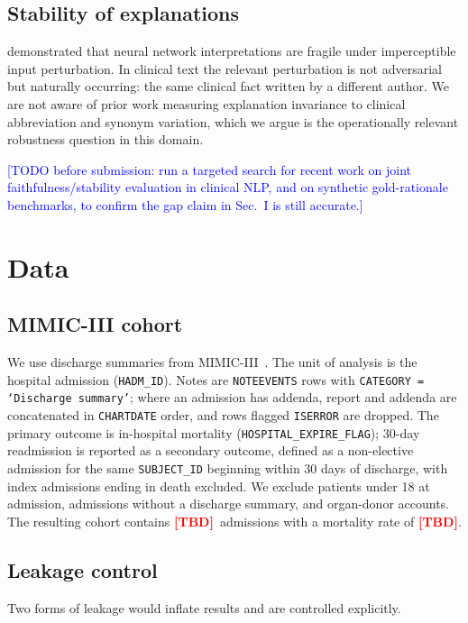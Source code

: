 \documentclass[conference]{IEEEtran}
\newif\ifdraftnums\draftnumstrue   %
\newcommand{\TBD}{\ifdraftnums\textcolor{red}{\textbf{[TBD]}}\else--\fi}
\newcommand{\note}[1]{\ifdraftnums\textcolor{blue}{\small[#1]}\fi}
\begin{document}
\subsection{Stability of explanations}
\cite{ghorbani2019} demonstrated that neural network interpretations are fragile
under imperceptible input perturbation. In clinical text the relevant
perturbation is not adversarial but naturally occurring: the same clinical fact
written by a different author. We are not aware of prior work measuring
explanation invariance to clinical abbreviation and synonym variation, which we
argue is the operationally relevant robustness question in this domain.

\note{TODO before submission: run a targeted search for recent work on joint
faithfulness/stability evaluation in clinical NLP, and on synthetic gold-rationale
benchmarks, to confirm the gap claim in Sec.~I is still accurate.}

\section{Data}\label{sec:data}

\subsection{MIMIC-III cohort}
We use discharge summaries from MIMIC-III~\cite{johnson2016}. The unit of
analysis is the hospital admission (\texttt{HADM\_ID}). Notes are
\texttt{NOTEEVENTS} rows with \texttt{CATEGORY = `Discharge summary'}; where an
admission has addenda, report and addenda are concatenated in \texttt{CHARTDATE}
order, and rows flagged \texttt{ISERROR} are dropped. The primary outcome is
in-hospital mortality (\texttt{HOSPITAL\_EXPIRE\_FLAG}); 30-day readmission is
reported as a secondary outcome, defined as a non-elective admission for the same
\texttt{SUBJECT\_ID} beginning within 30 days of discharge, with index admissions
ending in death excluded. We exclude patients under 18 at admission, admissions
without a discharge summary, and organ-donor accounts. The resulting cohort
contains \TBD\ admissions with a mortality rate of \TBD.

\subsection{Leakage control}
Two forms of leakage would inflate results and are controlled explicitly.
\end{document}
